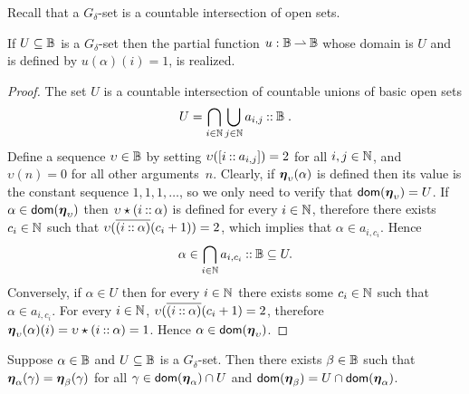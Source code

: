 %
%
Recall that a $G_\delta$-set is a countable intersection of open sets.

\begin{proposition}
  \label{th:G_delta_characteristic}%
  If $U \subseteq \mathbb{B}$ is a $G_\delta$-set then the partial
  function $u: \mathbb{B} \mathbin{\rightharpoonup} \mathbb{B}$ whose domain is $U$ and is
  defined by $u(\alpha)(i) = 1$, is realized.
\end{proposition}

\begin{proof}
  The set $U$ is a countable intersection of countable unions of basic
  open sets
  \begin{equation*}
    U = \bigcap_{i \in \mathbb{N}}
        \bigcup_{j \in \mathbb{N}} a_{i,j} \mathbin{{:}{:}} \mathbb{B} \;.
  \end{equation*}
  Define a sequence $\upsilon \in \mathbb{B}$ by setting
  $\upsilon([i \mathbin{{:}{:}} a_{i,j}]) = 2$ for all $i, j \in \mathbb{N}$, and
  $\upsilon(n) = 0$ for all other arguments~$n$. Clearly, if
  $\text{\boldmath{$\eta$}}_{\upsilon}(\alpha)$ is defined then its value is the constant
  sequence $1, 1, 1, \ldots$, so we only need to verify that
  $\mathsf{dom}(\text{\boldmath{$\eta$}}_\upsilon) = U$. If $\alpha \in \mathsf{dom}(\text{\boldmath{$\eta$}}_\upsilon)$
  then $\upsilon \star (i \mathbin{{:}{:}} \alpha)$ is defined for every $i \in
  \mathbb{N}$, therefore there exists $c_i \in \mathbb{N}$ such that $\upsilon
  (\overline{(i \mathbin{{:}{:}} \alpha)}(c_i + 1)) = 2$, which implies that $\alpha
  \in {a_{i, c_i}}$. Hence
  \begin{equation*}
    \alpha \in \bigcap_{i \in \mathbb{N}} a_{i, c_i} \mathbin{{:}{:}} \mathbb{B} \subseteq U.
  \end{equation*}
  Conversely, if $\alpha \in U$ then for every $i \in \mathbb{N}$ there
  exists some $c_i \in \mathbb{N}$ such that $\alpha \in a_{i, c_i}$. For
  every $i \in \mathbb{N}$, $\upsilon (\overline{(i \mathbin{{:}{:}} \alpha)}(c_i + 1) =
  2$, therefore $\text{\boldmath{$\eta$}}_{\upsilon}(\alpha)(i) = \upsilon \star
  (i \mathbin{{:}{:}} \alpha) = 1$. Hence $\alpha \in \mathsf{dom}(\text{\boldmath{$\eta$}}_\upsilon)$.
\end{proof}


\begin{corollary}
  \label{th:restrict_G_delta}%
  Suppose $\alpha \in \mathbb{B}$ and $U \subseteq \mathbb{B}$ is a $G_\delta$-set.
  Then there exists $\beta \in \mathbb{B}$ such that $\text{\boldmath{$\eta$}}_{\alpha}(\gamma) =
  \text{\boldmath{$\eta$}}_{\beta}(\gamma)$ for all $\gamma \in \mathsf{dom}(\text{\boldmath{$\eta$}}_\alpha) \cap U$ and
  $\mathsf{dom}(\text{\boldmath{$\eta$}}_\beta) = U \cap \mathsf{dom}(\text{\boldmath{$\eta$}}_\alpha)$.
\end{corollary}

